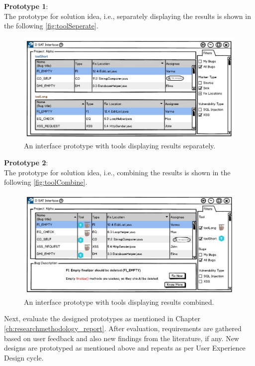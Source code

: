 \clearpage

\textbf{Prototype 1}:
\\
The prototype for solution idea, i.e., separately displaying the results is shown in the following \autoref{fig:toolSeperate}. \\ 

\begin{figure}[hbt!]
	\centering
	\includegraphics[width=\linewidth]{figures/d_seperate}
	\caption{An interface prototype with tools displaying results separately.}
	\label{fig:toolSeperate}
\end{figure}

\textbf{Prototype 2}:
\\
The prototype for solution idea, i.e., combining the results is shown in the following \autoref{fig:toolCombine}. \\

\begin{figure}[hbt!]
	\centering
	\includegraphics[width=\linewidth]{figures/d_combine}
	\caption{An interface prototype with tools displaying results combined.}
	\label{fig:toolCombine}
\end{figure}

\clearpage

Next, evaluate the designed prototypes as mentioned in Chapter \ref{ch:researchmethodology_report}. After evaluation, requirements are gathered based on user feedback and also new findings from the literature, if any. New designs are prototyped as mentioned above and repeats as per User Experience Design cycle. \\ \\

